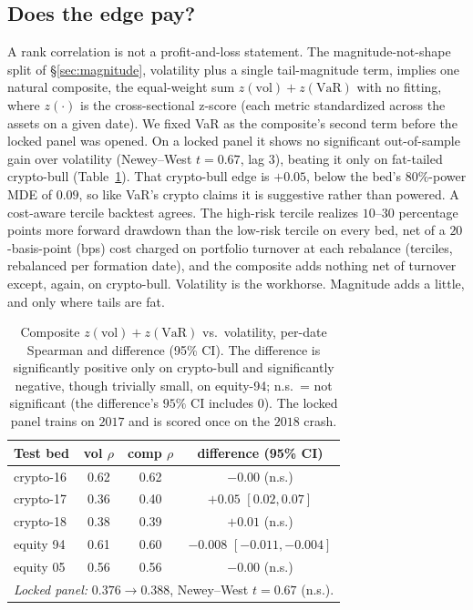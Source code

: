 \documentclass[sigconf,nonacm]{acmart}
\begin{document}
\subsection{Does the edge pay?}
A rank correlation is not a profit-and-loss statement.
The magnitude-not-shape split of \S\ref{sec:magnitude}, volatility plus a single
tail-magnitude term, implies one natural composite, the equal-weight sum
$z(\text{vol})+z(\text{VaR})$ with no fitting, where $z(\cdot)$ is the cross-sectional
z-score (each metric standardized across the assets on a given date). We fixed VaR as the
composite's second term before the locked panel was opened. On a locked panel it shows no
significant out-of-sample gain over volatility (Newey--West $t=0.67$, lag $3$), beating it
only on fat-tailed crypto-bull (Table~\ref{tab:econ}). That crypto-bull edge is $+0.05$,
below the bed's $80\%$-power MDE of $0.09$, so like VaR's crypto claims it is suggestive
rather than powered. A cost-aware tercile backtest agrees. The
high-risk tercile realizes $10$--$30$ percentage points more forward drawdown than the
low-risk tercile on every bed, net of a $20$-basis-point (bps) cost charged on portfolio
turnover at each rebalance (terciles, rebalanced per formation date), and the composite
adds nothing net of turnover except, again, on crypto-bull. Volatility is the workhorse.
Magnitude adds a little, and only where tails are fat.

\begin{table}[t]
\centering
\caption{Composite $z(\text{vol})+z(\text{VaR})$ vs.\ volatility, per-date Spearman
and difference (95\% CI). The difference is significantly positive only on crypto-bull and
significantly negative, though trivially small, on equity-94; n.s.\ = not significant (the
difference's $95\%$ CI includes $0$). The locked panel trains on $2017$ and is scored once
on the $2018$ crash.}
\label{tab:econ}
\small
\begin{tabular}{lccc}
\toprule
Test bed & vol $\rho$ & comp $\rho$ & difference (95\% CI) \\
\midrule
crypto-16 & 0.62 & 0.62 & $-0.00$ (n.s.) \\
crypto-17 & 0.36 & 0.40 & $+0.05$ $[0.02,0.07]$ \\
crypto-18 & 0.38 & 0.39 & $+0.01$ (n.s.) \\
equity 94 & 0.61 & 0.60 & $-0.008$ $[-0.011,-0.004]$ \\
equity 05 & 0.56 & 0.56 & $-0.00$ (n.s.) \\
\midrule
\multicolumn{4}{l}{\emph{Locked panel:} $0.376 \rightarrow 0.388$, Newey--West $t=0.67$ (n.s.).}\\
\bottomrule
\end{tabular}
\end{table}
\end{document}
